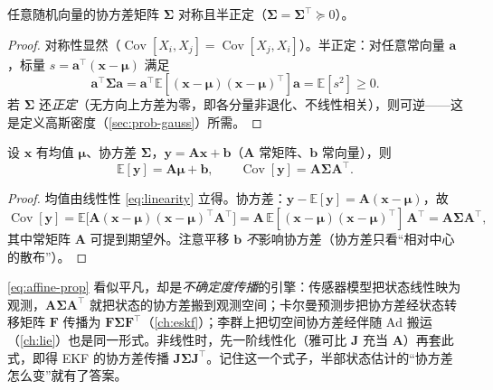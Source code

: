 \begin{proposition}[协方差矩阵对称半正定]\label{prop:cov-psd}
任意随机向量的协方差矩阵 $\boldsymbol{\Sigma}$ 对称且半正定（$\boldsymbol{\Sigma}=\boldsymbol{\Sigma}^\top\succeq0$）。
\end{proposition}
\begin{proof}
对称性显然（$\operatorname{Cov}[X_i,X_j]=\operatorname{Cov}[X_j,X_i]$）。半正定：对任意常向量 $\mathbf{a}$，标量 $s=\mathbf{a}^\top(\mathbf{x}-\boldsymbol{\mu})$ 满足
\[
  \mathbf{a}^\top\boldsymbol{\Sigma}\mathbf{a}=\mathbf{a}^\top\mathbb{E}[(\mathbf{x}-\boldsymbol{\mu})(\mathbf{x}-\boldsymbol{\mu})^\top]\mathbf{a}=\mathbb{E}[s^2]\ge0.
\]
若 $\boldsymbol{\Sigma}$ 还\emph{正定}（无方向上方差为零，即各分量非退化、不线性相关），则可逆——这是定义高斯密度（\cref{sec:prob-gauss}）所需。
\end{proof}

\begin{theorem}[线性变换的均值与协方差传播律]\label{thm:affine-prop}
设 $\mathbf{x}$ 有均值 $\boldsymbol{\mu}$、协方差 $\boldsymbol{\Sigma}$，$\mathbf{y}=\mathbf{A}\mathbf{x}+\mathbf{b}$（$\mathbf{A}$ 常矩阵、$\mathbf{b}$ 常向量），则
\begin{equation}
  \mathbb{E}[\mathbf{y}]=\mathbf{A}\boldsymbol{\mu}+\mathbf{b},\qquad
  \operatorname{Cov}[\mathbf{y}]=\mathbf{A}\boldsymbol{\Sigma}\mathbf{A}^\top.
  \label{eq:affine-prop}
\end{equation}
\end{theorem}
\begin{proof}
均值由线性性 \cref{eq:linearity} 立得。协方差：$\mathbf{y}-\mathbb{E}[\mathbf{y}]=\mathbf{A}(\mathbf{x}-\boldsymbol{\mu})$，故
\[
  \operatorname{Cov}[\mathbf{y}]=\mathbb{E}\big[\mathbf{A}(\mathbf{x}-\boldsymbol{\mu})(\mathbf{x}-\boldsymbol{\mu})^\top\mathbf{A}^\top\big]
  =\mathbf{A}\,\mathbb{E}[(\mathbf{x}-\boldsymbol{\mu})(\mathbf{x}-\boldsymbol{\mu})^\top]\,\mathbf{A}^\top=\mathbf{A}\boldsymbol{\Sigma}\mathbf{A}^\top,
\]
其中常矩阵 $\mathbf{A}$ 可提到期望外。注意平移 $\mathbf{b}$ \emph{不}影响协方差（协方差只看“相对中心的散布”）。
\end{proof}

\begin{insight}
\cref{eq:affine-prop} 看似平凡，却是\emph{不确定度传播}的引擎：传感器模型把状态线性映为观测，$\mathbf{A}\boldsymbol{\Sigma}\mathbf{A}^\top$ 就把状态的协方差搬到观测空间；卡尔曼预测步把协方差经状态转移矩阵 $\mathbf{F}$ 传播为 $\mathbf{F}\boldsymbol{\Sigma}\mathbf{F}^\top$（\cref{ch:eskf}）；李群上把切空间协方差经伴随 $\mathrm{Ad}$ 搬运（\cref{ch:lie}）也是同一形式。非线性时，先一阶线性化（雅可比 $\mathbf{J}$ 充当 $\mathbf{A}$）再套此式，即得 EKF 的协方差传播 $\mathbf{J}\boldsymbol{\Sigma}\mathbf{J}^\top$。记住这一个式子，半部状态估计的“协方差怎么变”就有了答案。
\end{insight}

